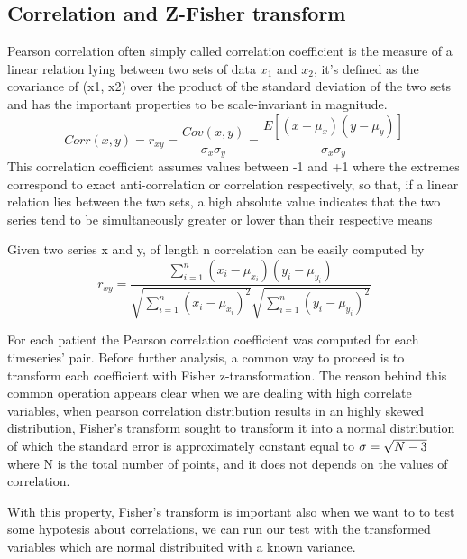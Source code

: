 \documentclass[a4paper,11pt]{article}
\begin{document}
\subsection{Correlation and Z-Fisher transform}

Pearson correlation often simply called correlation coefficient is the measure of a linear relation lying between two sets of data $x_1$ and $x_2$, it's defined as the covariance of (x1, x2) over the product of the standard deviation of the two sets and has the important properties to be scale-invariant in magnitude.
\begin{equation}
Corr(x, y) = r_{xy}=  \frac{Cov\left( x, y\right)}{\sigma_x \sigma_y} = \frac{E\left[ \left( x - \mu_x \right) \left( y - \mu_y \right)\right]}{\sigma_{x} \sigma_{y}}
\end{equation}
This correlation coefficient assumes values between -1 and +1 where the extremes correspond to exact anti-correlation or correlation respectively, so that, if a linear relation lies between the two sets, a high absolute value indicates that the two series tend to be simultaneously greater or lower than their respective means

Given two series x and y, of length n correlation can be easily computed by
\begin{equation}
r_{xy} = \frac{\sum_{i = 1}^n \left( x_i - \mu_{x_i}\right)\left( y_i - \mu_{y_i}\right)}{\sqrt{\sum_{i = 1}^n \left( x_i -\mu_{x_i}\right)^2}\sqrt{\sum_{i = 1}^n \left( y_i -\mu_{y_i}\right)^2}}
\end{equation}

For each patient the Pearson correlation coefficient was computed for each timeseries' pair. Before further analysis, a common way to proceed is to transform each coefficient with Fisher z-transformation.
The reason behind this common operation appears clear when we are dealing with high correlate variables, when pearson correlation distribution results in an highly skewed distribution, Fisher's transform sought to transform it into a normal distribution of which the standard error is approximately constant equal to $\sigma = \/\sqrt{N-3}$ where N is the total number of points, and it does not depends on the values of correlation.

With this property, Fisher's transform is important also when we want to to test some hypotesis about correlations, we can run our test with the transformed variables which are normal distribuited with a known variance.
\end{document}
